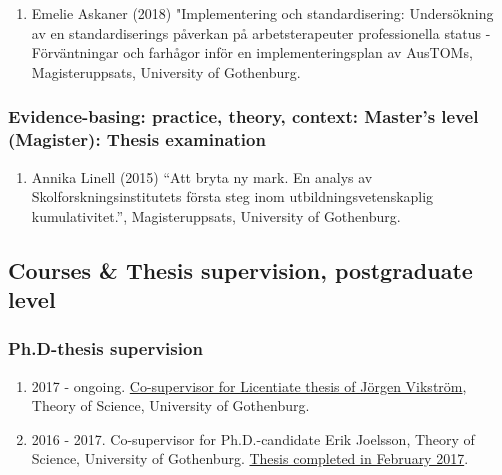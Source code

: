 \documentclass[
]{article}
\providecommand{\tightlist}{%
  \setlength{\itemsep}{0pt}\setlength{\parskip}{0pt}}
\begin{document}
\begin{enumerate}
\def\labelenumi{\arabic{enumi}.}
\tightlist
\item
  Emelie Askaner (2018) "Implementering och standardisering:
  Undersökning av en standardiserings påverkan på arbetsterapeuter
  professionella status - Förväntningar och farhågor inför en
  implementeringsplan av AusTOMs, Magisteruppsats, University of
  Gothenburg.
\end{enumerate}

\hypertarget{evidence-basing-practice-theory-context-masters-level-magister-thesis-examination}{%
\subsubsection{Evidence-basing: practice, theory, context: Master's
level (Magister): Thesis
examination}\label{evidence-basing-practice-theory-context-masters-level-magister-thesis-examination}}

\begin{enumerate}
\def\labelenumi{\arabic{enumi}.}
\tightlist
\item
  Annika Linell (2015) ``Att bryta ny mark. En analys av
  Skolforskningsinstitutets första steg inom utbildningsvetenskaplig
  kumulativitet.'', Magisteruppsats, University of Gothenburg.
\end{enumerate}

\hypertarget{courses-thesis-supervision-postgraduate-level}{%
\subsection{Courses \& Thesis supervision, postgraduate
level}\label{courses-thesis-supervision-postgraduate-level}}

\hypertarget{ph.d-thesis-supervision}{%
\subsubsection{Ph.D-thesis supervision}\label{ph.d-thesis-supervision}}

\begin{enumerate}
\def\labelenumi{\arabic{enumi}.}
\tightlist
\item
  2017 - ongoing.
  \href{http://files.christopherkullenberg.se/Beslut\%20byte\%20handledare\%20J\%20Vikstrom.pdf}{Co-supervisor
  for Licentiate thesis of Jörgen Vikström}, Theory of Science,
  University of Gothenburg.
\item
  2016 - 2017. Co-supervisor for Ph.D.-candidate Erik Joelsson, Theory
  of Science, University of Gothenburg.
  \href{https://gupea.ub.gu.se/handle/2077/51493}{Thesis completed in
  February 2017}.
\end{enumerate}
\end{document}
